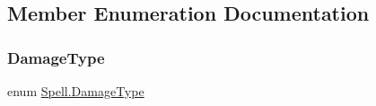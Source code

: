 \subsection{Member Enumeration Documentation}
\mbox{\label{class_spell_a3e228beaf92e2c035e6599aaf0ac2d2a}} 
\subsubsection{\texorpdfstring{DamageType}{DamageType}}
{\footnotesize\ttfamily enum \mbox{\hyperlink{class_spell_a3e228beaf92e2c035e6599aaf0ac2d2a}{Spell.\+Damage\+Type}}\hspace{0.3cm}{\ttfamily [strong]}}

